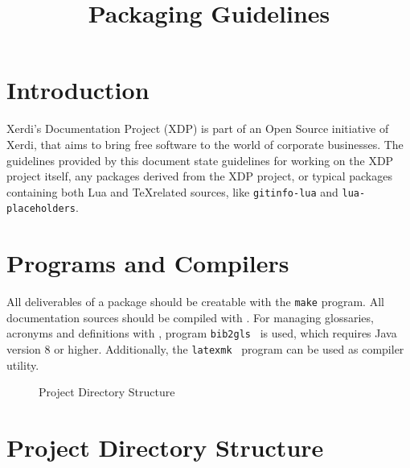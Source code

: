 \documentclass{xdpdoc}
\title{Packaging Guidelines}
\begin{document}
    \maketitle
    \section*{Introduction}

    Xerdi's Documentation Project (XDP) is part of an Open Source initiative of Xerdi, that aims to bring free software to the world of corporate businesses.
    The guidelines provided by this document state guidelines for working on the XDP project itself, any packages derived from the XDP project, or typical \LuaLaTeX packages containing both Lua and \TeX related sources, like \texttt{gitinfo-lua} and \texttt{lua-placeholders}.


    \section{Programs and Compilers}

    All deliverables of a package should be creatable with the \texttt{make} program.
    All documentation sources should be compiled with \LuaLaTeX.
    For managing glossaries, acronyms and definitions with \BibTeX, program \texttt{bib2gls}~\cite{bib2gls} is used, which requires Java version 8 or higher.
    Additionally, the \texttt{latexmk}~\cite{latexmk} program can be used as compiler utility.


    \begin{wrapfigure}{r}{7cm}
        \vspace*{-1.1cm}%
        \caption{Project Directory Structure}\label{fig:project dir}
    \end{wrapfigure}

    \section{Project Directory Structure}\label{sec:pds}
\end{document}
